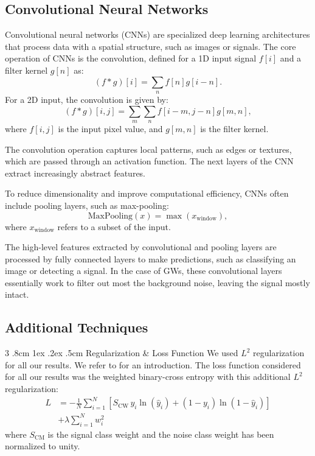 \documentclass[%
reprint,
amsmath,amssymb,
aps,
]{revtex4-2}
\makeatletter
\renewcommand{\subsubsection}{%
	\@startsection
	{subsubsection}%
	{3}%
	{\z@}%
	{.8cm \@plus1ex \@minus .2ex}%
	{.5cm}%
	{\normalfont\small\centering}%
}
\makeatother
\begin{document}
\subsection{Convolutional Neural Networks}
Convolutional neural networks (CNNs) are specialized deep learning architectures that process data with a spatial structure, such as images or signals. The core operation of CNNs is the convolution, defined for a 1D input signal $f[i]$ and a filter kernel $g[n]$ as:
\[(f*g)[i]=\sum_{n}f[n]g[i-n].\]
For a 2D input, the convolution is given by:
\[(f*g)[i,j]=\sum_{m}\sum_{n}f[i-m,j-n]g[m,n],\]
where $f[i,j]$ is the input pixel value, and $g[m,n]$ is the filter kernel.

The convolution operation captures local patterns, such as edges or textures, which are passed through an activation function. The next layers of the CNN extract increasingly abstract features.

To reduce dimensionality and improve computational efficiency, CNNs often include pooling layers, such as max-pooling:
\[\text{MaxPooling}(x)=\max(x_{\text{window}}),\]
where $x_{\text{window}}$ refers to a subset of the input.

The high-level features extracted by convolutional and pooling layers are processed by fully connected layers to make predictions, such as classifying an image or detecting a signal. In the case of GWs, these convolutional layers essentially work to filter out most the background noise, leaving the signal mostly intact. 



\subsection{Additional Techniques}
\subsubsection{Regularization \& Loss Function}
We used $L^2$ regularization for all our results. We refer to \cite{project1} for an introduction. The loss function considered for all our results was the weighted binary-cross entropy with this additional $L^2$ regularization:
\begin{align}
	L&=-\frac1N\sum_{i=1}^N\left[S_\text{CW}\,y_i\ln(\hat{y}_i)+(1-y_i)\ln(1-\hat{y}_i)\right]\nonumber\\
	&+\lambda\sum_{i=1}^Nw_i^2
\end{align}
where $S_{\text{CM}}$ is the signal class weight and the noise class weight has been normalized to unity.
\end{document}
